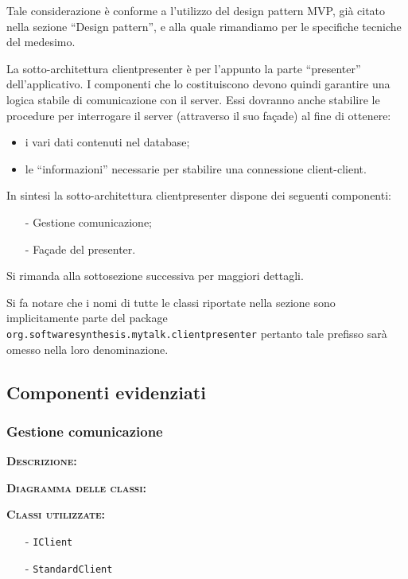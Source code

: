 Tale considerazione è conforme a l'utilizzo del design pattern MVP, già citato nella sezione ``Design pattern'', e alla quale rimandiamo per le specifiche tecniche del medesimo.

La sotto-architettura clientpresenter è per l'appunto la parte ``presenter'' dell'applicativo. I componenti che lo costituiscono devono quindi garantire una logica stabile di comunicazione con il server. Essi dovranno anche stabilire le procedure per interrogare il server (attraverso il suo façade) al fine di ottenere:
\begin{itemize}
	\item i vari dati contenuti nel database;
	\item le ``informazioni'' necessarie per stabilire una connessione client-client.
\end{itemize}

In sintesi la sotto-architettura clientpresenter dispone dei seguenti componenti:
\begin{itemize}[noitemsep,nolistsep]
	\item[-] Gestione comunicazione;
	\item[-] Façade del presenter.
\end{itemize}
Si rimanda alla sottosezione successiva per maggiori dettagli.

Si fa notare che i nomi di tutte le classi riportate nella sezione sono implicitamente parte del package \texttt{org.softwaresynthesis.mytalk.clientpresenter} pertanto tale prefisso sarà omesso nella loro denominazione.

\subsection{Componenti evidenziati}

\subsubsection{Gestione comunicazione}
\begin{description}
	\item{\scshape\bfseries Descrizione:} 
		
	\item{\scshape\bfseries Diagramma delle classi:}
	\item{\scshape\bfseries Classi utilizzate:} 
	\begin{itemize}[noitemsep,nolistsep]
		\item[-] \texttt{IClient}
		\item[-] \texttt{StandardClient}
	\end{itemize}  
\end{description}

